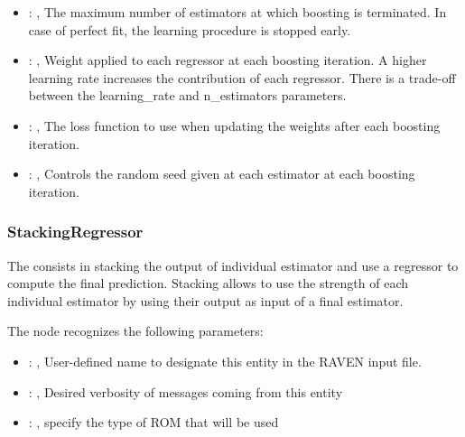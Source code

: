 \begin{itemize}
    \item {}: , 
      The maximum number of estimators at which boosting is
      terminated. In case of perfect fit, the learning procedure is
      stopped early.

    \item {}: , 
      Weight applied to each regressor at each boosting iteration.
      A higher learning rate increases the contribution of each regressor.
      There is a trade-off between the learning\_rate and n\_estimators
      parameters.

    \item {}: , 
      The loss function to use when updating the weights after each
      boosting iteration.

    \item {}: , 
      Controls the random seed given at each estimator at each
      boosting iteration.
  \end{itemize}


\subsubsection{StackingRegressor}
  The  consists in stacking the output of individual estimator and
  use a regressor to compute the final prediction. Stacking allows to use the strength of each
  individual estimator by using their output as input of a final estimator.

  The  node recognizes the following parameters:
    \begin{itemize}
      \item {}: , 
        User-defined name to designate this entity in the RAVEN input file.
      \item {}: , 
        Desired verbosity of messages coming from this entity
      \item {}: , 
        specify the type of ROM that will be used
  \end{itemize}

